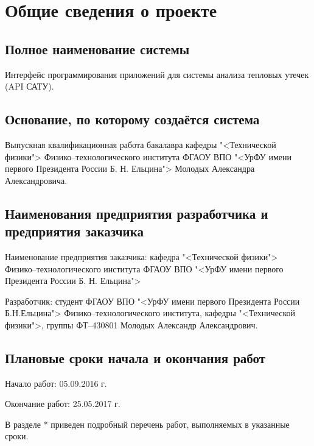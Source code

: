 \chapter{Общие сведения о проекте}

\section{Полное наименование системы}

\par
	Интерфейс программирования приложений для системы анализа тепловых утечек (API САТУ).

\section{Основание, по которому создаётся система}

\par
	Выпускная квалификационная работа бакалавра кафедры "<Технической физики"> Физико–технологи­ческого института ФГАОУ ВПО "<УрФУ имени первого Президента России Б. Н. Ельцина"> Молодых Александра Александровича.

\section{Наименования предприятия разработчика и предприятия заказчика}

\par
	Наименование предприятия заказчика: кафедра "<Технической физики"> Физико–технологи­ческого института ФГАОУ ВПО "<УрФУ имени первого Президента России Б. Н. Ельцина">

	Разработчик: студент ФГАОУ ВПО "<УрФУ имени первого Президента России Б.Н.Ельцина"> Физико–технологического института, кафедры "<Технической физики">, группы ФТ–430801 Молодых Александр Александрович.

\section{Плановые сроки начала и окончания работ}
	Начало работ: 05.09.2016 г.
	
	Окончание работ: 25.05.2017 г.
 
	В разделе * приведен подробный перечень работ, выполняемых в указанные сроки.
